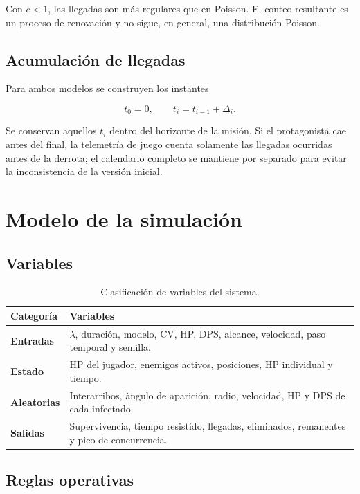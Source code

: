 \documentclass[12pt,a4paper]{article}
\begin{document}
Con $c<1$, las llegadas son m\'as regulares que en Poisson. El conteo resultante
es un proceso de renovaci\'on y no sigue, en general, una distribuci\'on Poisson.

\subsection{Acumulaci\'on de llegadas}

Para ambos modelos se construyen los instantes

\begin{equation}
t_0=0,\qquad t_i=t_{i-1}+\Delta_i.
\end{equation}

Se conservan aquellos $t_i$ dentro del horizonte de la misi\'on. Si el
protagonista cae antes del final, la telemetr\'ia de juego cuenta solamente las
llegadas ocurridas antes de la derrota; el calendario completo se mantiene por
separado para evitar la inconsistencia de la versi\'on inicial.

\section{Modelo de la simulaci\'on}

\subsection{Variables}

\begin{table}[H]
\centering
\caption{Clasificaci\'on de variables del sistema.}
\begin{tabular}{>{\bfseries}p{3.0cm}p{10.5cm}}
\toprule
Categor\'ia & Variables \\
\midrule
Entradas & $\lambda$, duraci\'on, modelo, CV, HP, DPS, alcance, velocidad,
paso temporal y semilla. \\
Estado & HP del jugador, enemigos activos, posiciones, HP individual y tiempo. \\
Aleatorias & Interarribos, \`angulo de aparici\'on, radio, velocidad, HP y DPS
de cada infectado. \\
Salidas & Supervivencia, tiempo resistido, llegadas, eliminados, remanentes y
pico de concurrencia. \\
\bottomrule
\end{tabular}
\end{table}

\subsection{Reglas operativas}
\end{document}
